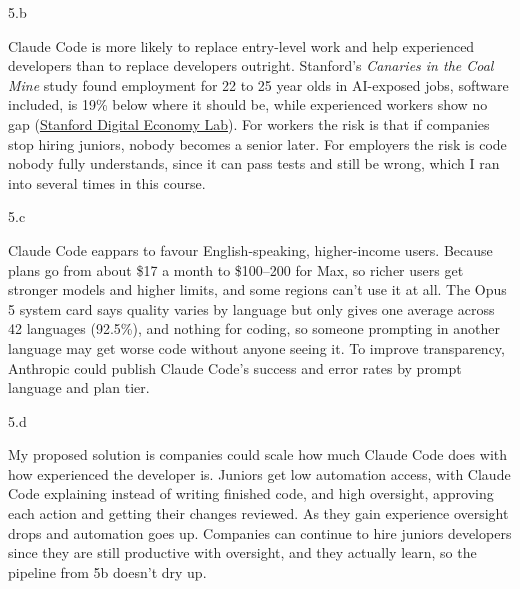 \LARGE
5.b
\normalsize

\begin{answer}
  Claude Code is more likely to replace entry-level work and help experienced developers than to
  replace developers outright. Stanford's \textit{Canaries in the Coal Mine} study found employment
  for 22 to 25 year olds in AI-exposed jobs, software included, is 19\% below where it should be, while
  experienced workers show no gap
  (\href{https://digitaleconomy.stanford.edu/news/canariesaug26/}{Stanford Digital Economy Lab}). For
  workers the risk is that if companies stop hiring juniors, nobody becomes a senior later. For
  employers the risk is code nobody fully understands, since it can pass tests and still be wrong,
  which I ran into several times in this course.
\end{answer}

\LARGE
5.c
\normalsize

\begin{answer}
  Claude Code eappars to favour English-speaking, higher-income users. Because plans go from about \$17 a month to
  \$100--200 for Max, so richer users get stronger models and higher limits, and some regions can't
  use it at all. The Opus 5 system card says quality varies by language but only gives one average
  across 42 languages (92.5\%), and nothing for coding, so someone prompting in another language may
  get worse code without anyone seeing it. To improve transparency, Anthropic could publish Claude Code's success and error
  rates by prompt language and plan tier.
\end{answer}

\LARGE
5.d
\normalsize

\begin{answer}
  My proposed solution is companies could scale how much Claude Code does with how experienced the developer is. Juniors get
  low automation access, with Claude Code explaining instead of writing finished code, and high oversight,
  approving each action and getting their changes reviewed. As they gain experience oversight drops
  and automation goes up. Companies can continue to hire
  juniors developers since they are still productive with oversight, and they actually learn, so the pipeline from 5b doesn't
  dry up.
\end{answer}
\clearpage

